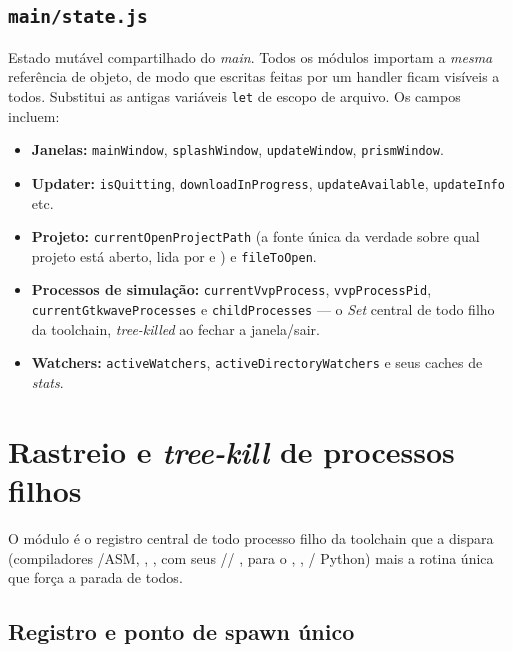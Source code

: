 \subsection{\texttt{main/state.js}}
\label{sec:05-state}

Estado mutável compartilhado do \emph{main}. Todos os módulos importam a
\emph{mesma} referência de objeto, de modo que escritas feitas por um handler
ficam visíveis a todos. Substitui as antigas variáveis \lstinline|let| de escopo
de arquivo. Os campos incluem:

\begin{itemize}[leftmargin=*]
  \item \textbf{Janelas:} \lstinline|mainWindow|, \lstinline|splashWindow|,
    \lstinline|updateWindow|, \lstinline|prismWindow|.
  \item \textbf{Updater:} \lstinline|isQuitting|,
    \lstinline|downloadInProgress|, \lstinline|updateAvailable|,
    \lstinline|updateInfo| etc.
  \item \textbf{Projeto:} \lstinline|currentOpenProjectPath| (a fonte única da
    verdade sobre qual projeto está aberto, lida por  e
    ) e \lstinline|fileToOpen|.
  \item \textbf{Processos de simulação:} \lstinline|currentVvpProcess|,
    \lstinline|vvpProcessPid|, \lstinline|currentGtkwaveProcesses| e
    \lstinline|childProcesses| --- o \emph{Set} central de todo filho da
    toolchain, \emph{tree-killed} ao fechar a janela/sair.
  \item \textbf{Watchers:} \lstinline|activeWatchers|,
    \lstinline|activeDirectoryWatchers| e seus caches de \emph{stats}.
\end{itemize}

\section{Rastreio e \emph{tree-kill} de processos filhos}
\label{sec:05-process-registry}

O módulo  é o registro central de todo processo
filho da toolchain que a  dispara (compiladores \cmm/ASM,
, ,  com seus //
,  para o , , /
Python) mais a rotina única que força a parada de todos.

\subsection{Registro e ponto de spawn único}

